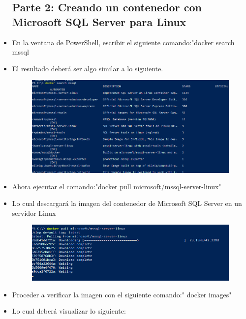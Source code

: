 \begin{itemize}
\subsection{Parte 2: Creando un contenedor con Microsoft SQL Server para Linux}
	\item En la ventana de PowerShell, escribir el siguiente comando:"docker search mssql      
	\item El resultado deberá ser algo similar a lo siguiente.
                     \begin{figure}[H]
		\begin{center}
		\includegraphics[width=15cm]{./Imagenes/3}
		\end{center}
		\end{figure}   
	\item Ahora ejecutar el comando:"docker pull microsoft/mssql-server-linux"
	\item Lo cual descargará la imagen del contenedor de Microsoft SQL Server en un servidor Linux
                     \begin{figure}[H]
		\begin{center}
		\includegraphics[width=15cm]{./Imagenes/4}
		\end{center}
		\end{figure}   
          \item Proceder a verificar la imagen con el siguiente comando:" docker images"
	\item Lo cual deberá visualizar lo siguiente:
                     \begin{figure}[H]

\end{figure}
\end{itemize}
